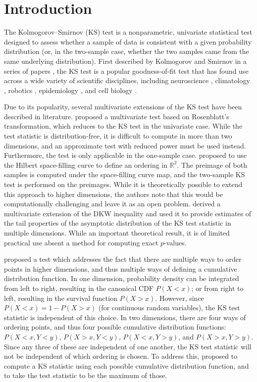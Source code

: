 \section{Introduction}
\label{introduction}
The Kolmogorov--Smirnov (KS) test is a nonparametric, univariate statistical test designed to assess whether a sample of data is consistent with a given probability distribution (or, in the two-sample case, whether the two samples came from the same underlying distribution). First described by Kolmogorov and Smirnov in a series of papers \citep{Kolmogorov1933, Kolmogorov1933a, Smirnov1936, Smirnov1937, Smirnov1939, Smirnov1944, Smirnov1948}, the KS test is a popular goodness-of-fit test that has found use across a wide variety of scientific disciplines, including neuroscience \citep{atasoy_2017}, climatology \citep{chiang_2018}, robotics \citep{hahne_2018}, epidemiology \citep{wong_2020}, and cell biology \citep{kaczanowska_2021}.

Due to its popularity, several multivariate extensions of the KS test have been described in literature. \citet{justel_1997} proposed a multivariate test based on Rosenblatt's transformation, which reduces to the KS test in the univariate case. While the test statistic is distribution-free, it is difficult to compute in more than two dimensions, and an approximate test with reduced power must be used instead. Furthermore, the test is only applicable in the one-sample case. \citet{heuchenne_2022} proposed to use the Hilbert space-filling curve to define an ordering in $\mathbb{R}^{2}$. The preimage of both samples is computed under the space-filling curve map, and the two-sample KS test is performed on the preimages. While it is theoretically possible to extend this approach to higher dimensions, the authors note that this would be computationally challenging and leave it as an open problem. \citet{naaman_2021} derived a multivariate extension of the DKW inequality and used it to provide estimates of the tail properties of the asymptotic distribution of the KS test statistic in multiple dimensions. While an important theoretical result, it is of limited practical use absent a method for computing exact $p$-values.

\citet{peacock_1983} proposed a test which addresses the fact that there are multiple ways to order points in higher dimensions, and thus multiple ways of defining a cumulative distribution function. In one dimension, probability density can be integrated from left to right, resulting in the canonical CDF $P(X<x)$; or from right to left, resulting in the survival function $P(X>x)$. However, since $P(X<x)=1-P(X>x)$ (for continuous random variables), the KS test statistic is independent of this choice. In two dimensions, there are four ways of ordering points, and thus four possible cumulative distribution functions: $P(X<x,Y<y)$, $P(X>x,Y<y)$, $P(X<x,Y>y)$, and $P(X>x,Y>y)$. Since any three of these are independent of one another, the KS test statistic will not be independent of which ordering is chosen. To address this, \citet{peacock_1983} proposed to compute a KS statistic using each possible cumulative distribution function, and to take the test statistic to be the maximum of those.

